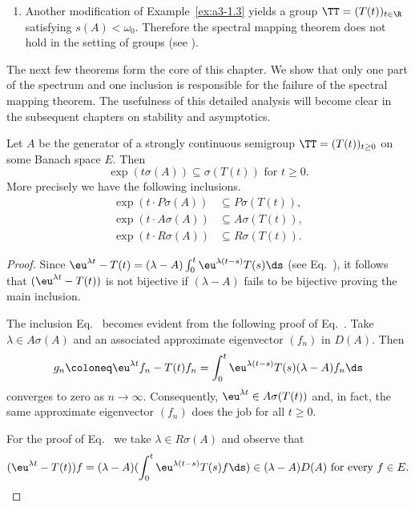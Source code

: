 \begin{example}
\begin{enumerate}[\upshape (i), wide, labelindent=.25em]
\item 
Another modification of Example~\ref{ex:a3-1.3} yields a group $\TT = (T(t))_{t \in \R}$ satisfying $s(A) < \omega_{0}$.
Therefore the spectral mapping theorem does not hold in the setting of groups (see \textcite{wolff:1981}).
\end{enumerate}
\end{example}
The next few theorems form the core of this chapter. 
We show that only one part of the spectrum and one inclusion is responsible for the failure of the spectral mapping theorem.
The usefulness of this detailed analysis will become clear in the subsequent chapters on stability and asymptotics.
\begin{proposition}
\label{prop:a3-6.2}%
Let $A$ be the generator of a strongly continuous semigroup $\TT = (T(t))_{t \geq 0}$ on some Banach space $E$.
Then
\[
\exp(t\sigma(A)) \subseteq \sigma(T(t)) \text{ for } t \geq 0 .
\]
More precisely we have the following inclusions.
\begin{align}
\exp(t \cdot P\sigma(A)) &\subseteq P\sigma(T(t)) \label{eq:a3-6.1} , \\
\exp(t \cdot A\sigma(A)) &\subseteq A\sigma(T(t)) \label{eq:a3-6.2} , \\
\exp(t \cdot R\sigma(A)) &\subseteq R\sigma(T(t)) \label{eq:a3-6.3} .
\end{align}
\end{proposition}
\begin{proof}
Since $\eu^{\lambda t} - T(t) = (\lambda - A)\int_{0}^{t} \eu^{\lambda(t-s)}T(s) \ds$ (see Eq.~), it follows that $(\eu^{\lambda t} - T(t))$ is not bijective if\/ $(\lambda - A)$ fails to be bijective proving the main inclusion.

The inclusion Eq.~ becomes evident from the following proof of Eq.~. Take $\lambda \in A\sigma(A)$ and an associated approximate eigenvector $(f_{n})$ in $D(A)$.
Then
\[%
g_{n} \coloneq \eu^{\lambda t}f_{n} - T(t)f_{n} = \int_{0}^{t} \eu^{\lambda(t-s)}T(s)(\lambda-A)f_{n} \ds
\]
converges to zero as $n \to \infty$.
Consequently, $\eu^{\lambda t} \in A\sigma(T(t))$ and, in fact, the same approximate eigenvector $(f_{n})$ does the job for all $t \geq 0$.

For the proof of Eq.~ we take $\lambda \in R\sigma(A)$ and observe that 
\begin{equation*}
(\eu^{\lambda t} - T(t))f = (\lambda - A)(\int_{0}^{t} \eu^{\lambda(t-s)}T(s)f \ds) \in (\lambda - A)D(A) \text{ for every } f \in E.
\qedhere
\end{equation*}
\end{proof}
